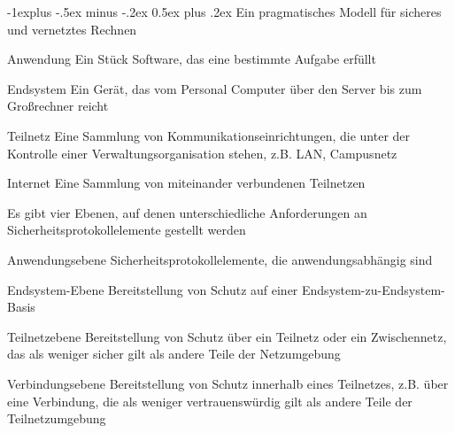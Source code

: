 \documentclass[a4paper]{article}
\makeatletter
\renewcommand{\subsection}{\@startsection{subsection}{2}{0mm}%
 {-1explus -.5ex minus -.2ex}%
 {0.5ex plus .2ex}%
 {\normalfont\normalsize\bfseries}}
\makeatother
\begin{document}
\begin{multicols}{3}
      \subsection{Ein pragmatisches Modell für sicheres und vernetztes Rechnen}
      \begin{description*}
            \item[Anwendung] Ein Stück Software, das eine bestimmte Aufgabe erfüllt%
            \item[Endsystem] Ein Gerät, das vom Personal Computer über den Server bis zum Großrechner reicht
            \item[Teilnetz] Eine Sammlung von Kommunikationseinrichtungen, die unter der Kontrolle einer Verwaltungsorganisation stehen, z.B. LAN, Campusnetz
            \item[Internet] Eine Sammlung von miteinander verbundenen Teilnetzen
      \end{description*}
      Es gibt vier Ebenen, auf denen unterschiedliche Anforderungen an Sicherheitsprotokollelemente gestellt werden
      \begin{description*}
            \item[Anwendungsebene] Sicherheitsprotokollelemente, die anwendungsabhängig sind
            \item[Endsystem-Ebene] Bereitstellung von Schutz auf einer Endsystem-zu-Endsystem-Basis
            \item[Teilnetzebene] Bereitstellung von Schutz über ein Teilnetz oder ein Zwischennetz, das als weniger sicher gilt als andere Teile der Netzumgebung
            \item[Verbindungsebene] Bereitstellung von Schutz innerhalb eines Teilnetzes, z.B. über eine Verbindung, die als weniger vertrauenswürdig gilt als andere Teile der Teilnetzumgebung
      \end{description*}


\end{multicols}
\end{document}
